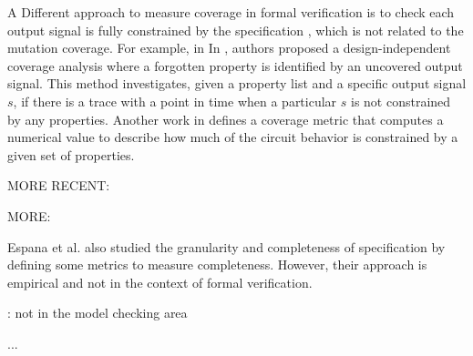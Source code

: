 A Different approach to measure coverage in formal verification is to check each output signal is fully constrained by the specification \cite{das2005formal, claessen2007coverage, grosse2007estimating}, which is not related to the mutation coverage. For example, in In \cite{claessen2007coverage}, authors proposed a design-independent coverage analysis where a forgotten property is identified by an uncovered output signal. This method investigates, given a property list and a specific output signal $s$, if there is a trace with a point in time when a particular $s$ is not constrained by any properties. Another work in \cite{haedicke2012guiding} defines a coverage metric that computes a numerical value to describe how much of the circuit behavior is constrained by a given set of properties.

MORE RECENT: \cite{yang2013minimal} \cite{chockler2011incremental} \cite{brillout2009mutation}

MORE:

Espana et al. \cite{espana2009evaluating} also studied the granularity and completeness of specification by defining some metrics to measure completeness. However, their approach is empirical and not in the context of formal verification.

\cite{drechsler2012completeness, firesmith2005your, chang2007finding,katta2013investigating, zowghi2002three} : not in the model checking area

\cite{Whalen07:FMICS} ...
